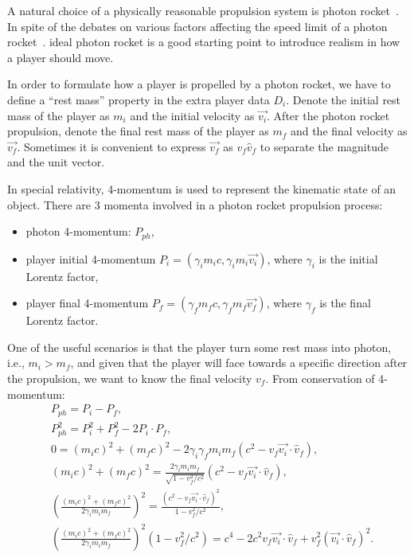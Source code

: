 \documentclass{article}
\begin{document}
A natural choice of a physically reasonable propulsion system is photon rocket~\cite{pierce1959relativity}.
In spite of the debates on various factors affecting the speed limit of a photon rocket~\cite{haug2017ultimate, tommasini2019comment}.
ideal photon rocket is a good starting point to introduce realism in how a player should move.

In order to formulate how a player is propelled by a photon rocket, 
we have to define a ``rest mass'' property in the extra player data $D_i$.
Denote the initial rest mass of the player as $m_i$ and the initial velocity as $\overrightarrow{v_i}$.
After the photon rocket propulsion,
denote the final rest mass of the player as $m_f$ and the final velocity as $\overrightarrow{v_f}$. 
Sometimes it is convenient to express $\overrightarrow{v_f}$ as $v_f \hat{v}_f$ to separate the magnitude and the unit vector.

In special relativity, 4-momentum is used to represent the kinematic state of an object.
There are 3 momenta involved in a photon rocket propulsion process:
\begin{itemize}
  \item photon 4-momentum: $P_{ph}$,
  \item player initial 4-momentum $P_i = (\gamma_i m_i c, \gamma_i m_i \overrightarrow{v_i}) $, 
        where $\gamma_i$ is the initial Lorentz factor,
  \item player final 4-momentum $P_f = (\gamma_f m_f c, \gamma_f m_f \overrightarrow{v_f})$, 
        where $\gamma_f$ is the final Lorentz factor.
\end{itemize}

One of the useful scenarios is that the player turn some rest mass into photon, i.e., $m_i > m_f$,
and given that the player will face towards a specific direction after the propulsion,
we want to know the final velocity $v_f$.
From conservation of 4-momentum:
\begin{align*}
    & P_{ph} = P_i - P_f, \\
    & P_{ph}^2 = P_i^2 + P_f^2 - 2 P_i \cdot P_f, \\
    & 0 = (m_i c)^2 + (m_f c)^2 - 2 \gamma_i \gamma_f m_i m_f ( c^2 - v_f \overrightarrow{v_i} \cdot \hat{v}_f), \\
    & (m_i c)^2 + (m_f c)^2 = \frac{2 \gamma_i m_i m_f}{\sqrt{1 - v_f^2 / c^2}} ( c^2 - v_f \overrightarrow{v_i} \cdot \hat{v}_f), \\
    & \left(\frac{(m_i c)^2 + (m_f c)^2}{2 \gamma_i m_i m_f}\right)^2 = \frac{(c^2 - v_f \overrightarrow{v_i} \cdot \hat{v}_f)^2}{1 - v_f^2 / c^2}, \\
    & \left(\frac{(m_i c)^2 + (m_f c)^2}{2 \gamma_i m_i m_f}\right)^2 (1 - v_f^2 / c^2) = c^4 - 2 c^2 v_f \overrightarrow{v_i} \cdot \hat{v}_f + v_f^2 (\overrightarrow{v_i} \cdot \hat{v}_f)^2. \\
\end{align*}
\end{document}
